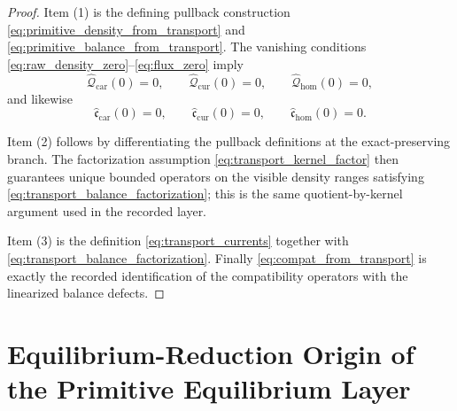 \documentclass[11pt]{article}
\newcommand{\TensorPrimitiveDensity}{\widehat{\mathcal Q}_{\mathrm{car}}}
\newcommand{\CurPrimitiveDensity}{\widehat{\mathcal Q}_{\mathrm{cur}}}
\newcommand{\HomPrimitiveDensity}{\widehat{\mathcal Q}_{\mathrm{hom}}}
\newcommand{\TensorBalance}{\widehat{\mathfrak c}_{\mathrm{car}}}
\newcommand{\CurBalance}{\widehat{\mathfrak c}_{\mathrm{cur}}}
\newcommand{\HomBalance}{\widehat{\mathfrak c}_{\mathrm{hom}}}
\begin{document}
\begin{proof}
Item (1) is the defining pullback construction \eqref{eq:primitive_density_from_transport} and \eqref{eq:primitive_balance_from_transport}. The vanishing conditions \eqref{eq:raw_density_zero}--\eqref{eq:flux_zero} imply
\[
\TensorPrimitiveDensity(0)=0,\qquad
\CurPrimitiveDensity(0)=0,\qquad
\HomPrimitiveDensity(0)=0,
\]
and likewise
\[
\TensorBalance(0)=0,\qquad
\CurBalance(0)=0,\qquad
\HomBalance(0)=0.
\]

Item (2) follows by differentiating the pullback definitions at the exact-preserving branch. The factorization assumption \eqref{eq:transport_kernel_factor} then guarantees unique bounded operators on the visible density ranges satisfying \eqref{eq:transport_balance_factorization}; this is the same quotient-by-kernel argument used in the recorded layer.

Item (3) is the definition \eqref{eq:transport_currents} together with \eqref{eq:transport_balance_factorization}. Finally \eqref{eq:compat_from_transport} is exactly the recorded identification of the compatibility operators with the linearized balance defects.
\end{proof}

\section{Equilibrium-Reduction Origin of the Primitive Equilibrium Layer}
\end{document}
